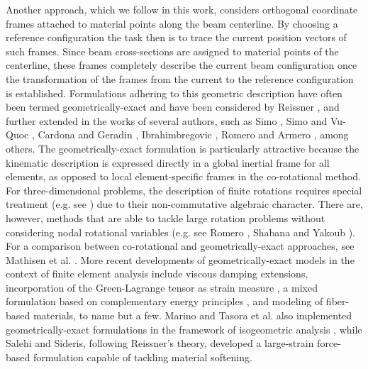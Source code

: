 Another approach, which we follow in this work, considers orthogonal coordinate
frames attached to material points along the beam centerline. By choosing
a reference configuration the task then is to trace the current position vectors
of such frames. Since beam cross-sections are assigned to material points of the
centerline, these frames completely describe the current beam configuration 
once the transformation of the frames from the current to the reference
configuration is established. Formulations adhering to this geometric description
have often been termed geometrically-exact and have been considered by
Reissner \cite{Reissner1}, and further
extended in the works of several authors, such as Simo \cite{Simo1}, Simo and
Vu-Quoc \cite{Simo2,Simo3}, Cardona and Geradin \cite{Cardona1}, Ibrahimbregovic 
\cite{Ibrahim1},  Romero and Armero \cite{RomArm}, among others.
The geometrically-exact formulation is particularly attractive because the
kinematic description is expressed directly in a global inertial frame for all
elements, as opposed to local element-specific frames in the co-rotational method. For 
three-dimensional problems, the description of finite rotations requires
special treatment (e.g. see \cite{Argyris:1982,Romero:2004}) due to their
non-commutative algebraic character. There are, however, methods that
are able to tackle large rotation problems without considering nodal rotational
variables (e.g. see Romero \cite{Romero:2008}, Shabana and Yakoub 
\cite{Shabana}).
For a comparison between co-rotational and geometrically-exact approaches,
see Mathisen et al. \cite{Mathisen}.
More recent developments of geometrically-exact models in the context of
finite element analysis include viscous damping extensions\cite{Oliveto},
incorporation of the Green-Lagrange tensor as strain measure \cite{Panteli},
a mixed formulation based on complementary energy principles \cite{Santos},
and modeling of fiber-based
materials\cite{Meier}, to name but a few. Marino \cite{Marino} and
Tasora et al. \cite{Tasora} also implemented geometrically-exact formulations
in the framework of isogeometric analysis \cite{HughesBaz}, while
Salehi and Sideris\cite{Salehi}, following Reissner's theory, developed a
large-strain force-based formulation capable of tackling material softening.

